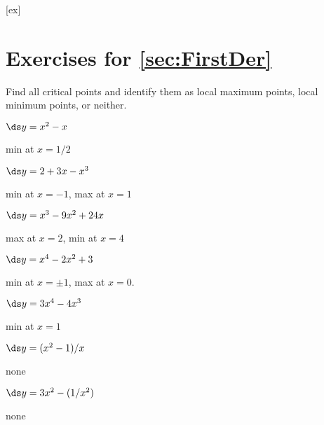 [ex]
\section*{Exercises for \ref{sec:FirstDer}}

\begin{enumialphparenastyle}

Find all critical points and identify them as local maximum points, local minimum points, or neither.

\begin{ex}
 $\ds y=x^2-x$ 
\begin{sol}
 min at $x=1/2$
\end{sol}
\end{ex}

\begin{ex}
 $\ds y=2+3x-x^3$ 
\begin{sol}
 min at $x=-1$, max at $x=1$
\end{sol}
\end{ex}

\begin{ex}
 $\ds y=x^3-9x^2+24x$
\begin{sol}
 max at $x=2$, min at $x=4$
\end{sol}
\end{ex}

\begin{ex}
 $\ds y=x^4-2x^2+3$ 
\begin{sol}
 min at $x=\pm 1$, max at $x=0$.
\end{sol}
\end{ex}

\begin{ex}
 $\ds y=3x^4-4x^3$
\begin{sol}
 min at $x=1$
\end{sol}
\end{ex}

\begin{ex}
 $\ds y=(x^2-1)/x$
\begin{sol}
 none
\end{sol}
\end{ex}

\begin{ex}
 $\ds y=3x^2-(1/x^2)$ 
\begin{sol}
 none
\end{sol}
\end{ex}


\end{enumialphparenastyle}
